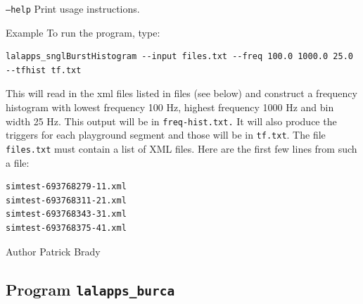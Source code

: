 \begin{entry}
\begin{entry}
\item[\texttt{--help}] Print usage instructions.
\end{entry}


\item[Example]
To run the program,  type:
\begin{verbatim}
lalapps_snglBurstHistogram --input files.txt --freq 100.0 1000.0 25.0 --tfhist tf.txt
\end{verbatim}
This will read in the xml files listed in files (see below) and
construct a frequency histogram with lowest frequency 100 Hz,  highest
frequency 1000 Hz and bin width 25 Hz. This output will be in \verb$freq-hist.txt.$
It will also produce the triggers for each playground segment and those will be in \verb$tf.txt$.  The file \verb$files.txt$
must contain a list of XML files.  Here are the first few lines from
such a file:
\begin{verbatim}
simtest-693768279-11.xml
simtest-693768311-21.xml
simtest-693768343-31.xml
simtest-693768375-41.xml
\end{verbatim}

\item[Author]
Patrick Brady

\end{entry}
\clearpage

\subsection{Program \texttt{lalapps\_burca}}
\label{program:lalapps-burca}

